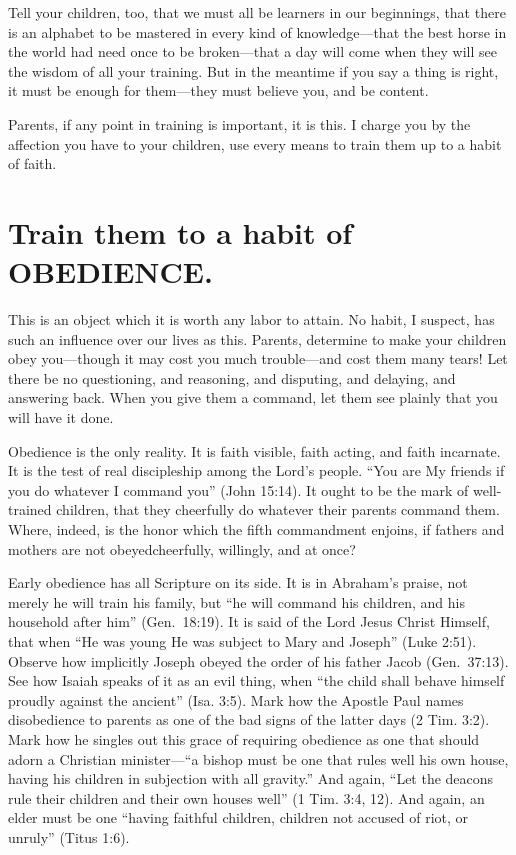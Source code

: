 \documentclass[
]{book}
\begin{document}
Tell your children, too, that we must all be learners in our beginnings, that there is an alphabet to be mastered in every kind of knowledge---that the best horse in the world had need once to be broken---that a day will come when they will see the wisdom of all your training. But in the meantime if you say a thing is right, it must be enough for them---they must believe you, and be content.

Parents, if any point in training is important, it is this. I charge you by the affection you have to your children, use every means to train them up to a habit of faith.

\hypertarget{train-them-to-a-habit-of-obedience.}{%
\chapter{Train them to a habit of OBEDIENCE.}\label{train-them-to-a-habit-of-obedience.}}

This is an object which it is worth any labor to attain. No habit, I suspect, has such an influence over our lives as this. Parents, determine to make your children obey you---though it may cost you much trouble---and cost them many tears! Let there be no questioning, and reasoning, and disputing, and delaying, and answering back. When you give them a command, let them see plainly that you will have it done.

Obedience is the only reality. It is faith visible, faith acting, and faith incarnate. It is the test of real discipleship among the Lord's people. ``You are My friends if you do whatever I command you'' (John 15:14). It ought to be the mark of well-trained children, that they cheerfully do whatever their parents command them. Where, indeed, is the honor which the fifth commandment enjoins, if fathers and mothers are not obeyedcheerfully, willingly, and at once?

Early obedience has all Scripture on its side. It is in Abraham's praise, not merely he will train his family, but ``he will command his children, and his household after him'' (Gen.~18:19). It is said of the Lord Jesus Christ Himself, that when ``He was young He was subject to Mary and Joseph'' (Luke 2:51). Observe how implicitly Joseph obeyed the order of his father Jacob (Gen.~37:13). See how Isaiah speaks of it as an evil thing, when ``the child shall behave himself proudly against the ancient'' (Isa. 3:5). Mark how the Apostle Paul names disobedience to parents as one of the bad signs of the latter days (2 Tim. 3:2). Mark how he singles out this grace of requiring obedience as one that should adorn a Christian minister---``a bishop must be one that rules well his own house, having his children in subjection with all gravity.'' And again, ``Let the deacons rule their children and their own houses well'' (1 Tim. 3:4, 12). And again, an elder must be one ``having faithful children, children not accused of riot, or unruly'' (Titus 1:6).
\end{document}
